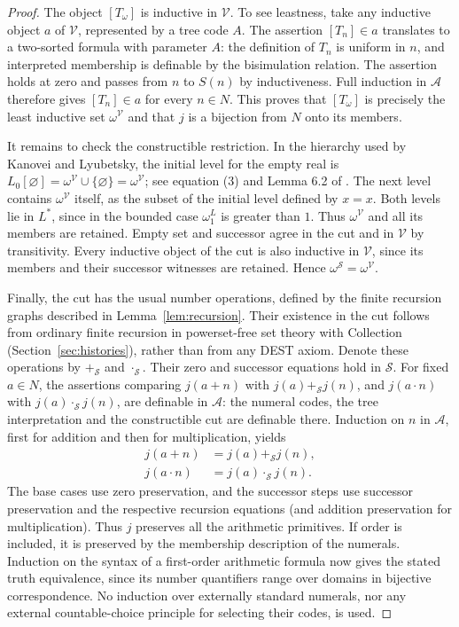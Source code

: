 \documentclass[11pt,a4paper]{article}
\numberwithin{equation}{section}
\theoremstyle{definition}
\theoremstyle{remark}
\begin{document}
\begin{proof}
The object $[T_\omega]$ is inductive in $\mathcal V$. To see leastness, take any inductive object $a$ of $\mathcal V$, represented by a tree code $A$. The assertion $[T_n]\in a$ translates to a two-sorted formula with parameter $A$: the definition of $T_n$ is uniform in $n$, and interpreted membership is definable by the bisimulation relation. The assertion holds at zero and passes from $n$ to $S(n)$ by inductiveness. Full induction in $\mathcal A$ therefore gives $[T_n]\in a$ for every $n\in N$. This proves that $[T_\omega]$ is precisely the least inductive set $\omega^{\mathcal V}$ and that $j$ is a bijection from $N$ onto its members.

It remains to check the constructible restriction. In the hierarchy used by Kanovei and Lyubetsky, the initial level for the empty real is $L_0[\varnothing]=\omega^{\mathcal V}\cup\{\varnothing\}=\omega^{\mathcal V}$; see equation (3) and Lemma 6.2 of \cite{kl}. The next level contains $\omega^{\mathcal V}$ itself, as the subset of the initial level defined by $x=x$. Both levels lie in $L^*$, since in the bounded case $\omega_1^L$ is greater than $1$. Thus $\omega^{\mathcal V}$ and all its members are retained. Empty set and successor agree in the cut and in $\mathcal V$ by transitivity. Every inductive object of the cut is also inductive in $\mathcal V$, since its members and their successor witnesses are retained. Hence $\omega^{\mathcal S}=\omega^{\mathcal V}$.

Finally, the cut has the usual number operations, defined by the finite recursion graphs described in Lemma~\ref{lem:recursion}. Their existence in the cut follows from ordinary finite recursion in powerset-free set theory with Collection (Section~\ref{sec:histories}), rather than from any DEST axiom. Denote these operations by $+_{\mathcal S}$ and $\cdot_{\mathcal S}$. Their zero and successor equations hold in $\mathcal S$. For fixed $a\in N$, the assertions comparing $j(a+n)$ with $j(a)+_{\mathcal S}j(n)$, and $j(a\cdot n)$ with $j(a)\cdot_{\mathcal S}j(n)$, are definable in $\mathcal A$: the numeral codes, the tree interpretation and the constructible cut are definable there. Induction on $n$ in $\mathcal A$, first for addition and then for multiplication, yields
\begin{align*}
j(a+n)&=j(a)+_{\mathcal S}j(n),\\
j(a\cdot n)&=j(a)\cdot_{\mathcal S}j(n).
\end{align*}
The base cases use zero preservation, and the successor steps use successor preservation and the respective recursion equations (and addition preservation for multiplication). Thus $j$ preserves all the arithmetic primitives. If order is included, it is preserved by the membership description of the numerals. Induction on the syntax of a first-order arithmetic formula now gives the stated truth equivalence, since its number quantifiers range over domains in bijective correspondence. No induction over externally standard numerals, nor any external countable-choice principle for selecting their codes, is used.
\end{proof}
\end{document}
